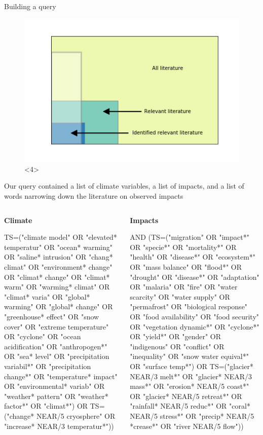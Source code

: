 \documentclass[9pt]{beamer}
\begin{document}
\begin{frame}{Building a query}
\begin{figure}
	\includegraphics[width=0.7\linewidth]{../plots/lit_plot_query_2.png}<4>
\end{figure}
\end{frame}

\begin{frame}{Our query contained a list of climate variables, a list of impacts, and a list of words narrowing down the literature on observed impacts}

\begin{columns}
	\begin{column}{0.33\linewidth}
		\textbf{Climate}
		
		\scriptsize
		
		TS=("climate model" OR "elevated* temperatur" OR "ocean* warming" OR "saline* intrusion" OR "chang* climat" OR "environment* change" OR "climat* change" OR "climat* warm" OR "warming* climat" OR "climat* varia" OR "global* warming" OR "global* change" OR "greenhouse* effect" OR "snow cover" OR "extreme temperature" OR "cyclone" OR "ocean acidification" OR "anthropogen*" OR "sea* level" OR "precipitation variabil*" OR "precipitation change*" OR "temperature* impact" OR "environmental* variab" OR "weather* pattern" OR "weather* factor*" OR "climat*") OR TS=("change* NEAR/5 cryosphere" OR "increase* NEAR/3 temperatur*")) 
		
	\end{column}
	\begin{column}{0.33\linewidth}
		
		\textbf{Impacts}
		
		\scriptsize
		
		AND (TS=("migration" OR "impact*" OR "specie*" OR "mortality*" OR "health" OR "disease*" OR "ecosystem*" OR "mass balance" OR "flood*" OR "drought" OR "disease*" OR "adaptation" OR "malaria" OR "fire" OR "water scarcity" OR "water supply" OR "permafrost" OR "biological response" OR "food availability" OR "food security" OR "vegetation dynamic*" OR "cyclone*" OR "yield*" OR "gender" OR "indigenous" OR "conflict" OR "inequality" OR "snow water equival*" OR "surface temp*") OR TS=("glacier* NEAR/3 melt*" OR "glacier* NEAR/3 mass*" OR "erosion* NEAR/5 coast*" OR "glacier* NEAR/5 retreat*" OR "rainfall* NEAR/5 reduc*" OR "coral* NEAR/5 stress*" OR "precip* NEAR/5 *crease*" OR "river NEAR/5 flow"))
		

\end{column}
\end{columns}
\end{frame}
\end{document}
